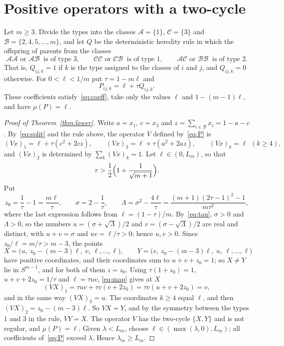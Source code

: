 \documentclass[11pt]{amsart}
\theoremstyle{definition}
\theoremstyle{remark}
\begin{document}
\section{Positive operators with a two-cycle}\label{sec:lower}

Let $m\ge3$. Divide the types into the classes $\mathcal A=\{1\}$, $\mathcal C=\{3\}$ and $\mathcal B=\{2,4,5,\dots,m\}$,
and let $Q$ be the deterministic heredity rule in which the offspring of parents from the classes
\[
\mathcal A\mathcal A\text{ or }\mathcal A\mathcal B\ \text{ is of type }3,\qquad
\mathcal C\mathcal C\text{ or }\mathcal C\mathcal B\ \text{ is of type }1,\qquad
\mathcal A\mathcal C\text{ or }\mathcal B\mathcal B\ \text{ is of type }2 .
\]
That is, $Q_{ij,k}=1$ if $k$ is the type assigned to the classes of $i$ and $j$, and $Q_{ij,k}=0$ otherwise. For
$0<\ell<1/m$ put $\tau=1-m\ell$ and
\begin{equation}\label{eq:P}
P_{ij,k}=\ell+\tau Q_{ij,k}.
\end{equation}
These coefficients satisfy~\eqref{eq:coeff}, take only the values $\ell$ and $1-(m-1)\ell$, and have $\mu(P)=\ell$.

\begin{proof}[Proof of Theorem~\ref{thm:lower}]
Write $a=x_1$, $c=x_3$ and $z=\sum_{i\in\mathcal B}x_i=1-a-c$. By~\eqref{eq:split} and the rule above, the operator
$V$ defined by~\eqref{eq:P} is
\begin{equation}\label{eq:map}
(Vx)_1=\ell+\tau(c^2+2cz),\qquad (Vx)_3=\ell+\tau(a^2+2az),\qquad (Vx)_k=\ell\ \ (k\ge4),
\end{equation}
and $(Vx)_2$ is determined by $\sum_k(Vx)_k=1$. Let $\ell\in(0,L_m)$, so that
\begin{equation}\label{eq:tau}
\tau>\frac12\Bigl(1+\frac1{\sqrt{m+1}}\Bigr).
\end{equation}
Put
\[
z_0=\frac1\tau-1=\frac{m\ell}{\tau},\qquad \sigma=2-\frac1\tau,\qquad
\Lambda=\sigma^2-\frac{4\ell}{\tau}=\frac{(m+1)(2\tau-1)^2-1}{m\tau^2},
\]
where the last expression follows from $\ell=(1-\tau)/m$. By~\eqref{eq:tau}, $\sigma>0$ and $\Lambda>0$, so the numbers
$u=(\sigma+\sqrt\Lambda)/2$ and $v=(\sigma-\sqrt\Lambda)/2$ are real and distinct, with $u+v=\sigma$ and $uv=\ell/\tau>0$;
hence $u,v>0$. Since $z_0/\ell=m/\tau>m-3$, the points
\[
X=\bigl(u,\ z_0-(m-3)\ell,\ v,\ \ell,\dots,\ell\bigr),\qquad Y=\bigl(v,\ z_0-(m-3)\ell,\ u,\ \ell,\dots,\ell\bigr)
\]
have positive coordinates, and their coordinates sum to $u+v+z_0=1$; so $X\ne Y$ lie in $S^{m-1}$, and for both of them
$z=z_0$. Using $\tau(1+z_0)=1$, $u+v+2z_0=1/\tau$ and $\ell=\tau uv$, \eqref{eq:map} gives at $X$
\[
(VX)_1=\tau uv+\tau v(v+2z_0)=\tau v(u+v+2z_0)=v,
\]
and in the same way $(VX)_3=u$. The coordinates $k\ge4$ equal $\ell$, and then $(VX)_2=z_0-(m-3)\ell$. So $VX=Y$, and by
the symmetry between the types $1$ and $3$ in the rule, $VY=X$. The operator $V$ has the two-cycle $\{X,Y\}$ and is not
regular, and $\mu(P)=\ell$. Given $\lambda<L_m$, choose $\ell\in(\max(\lambda,0),L_m)$; all coefficients
of~\eqref{eq:P} exceed $\lambda$. Hence $\lambda_m\ge L_m$.
\end{proof}
\end{document}
